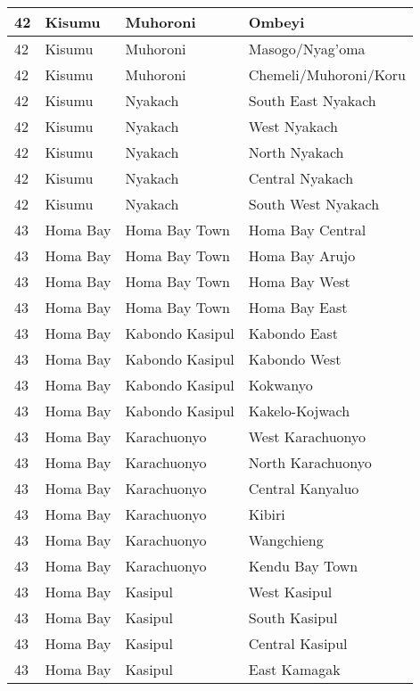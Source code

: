 \begin{table}[!ht]
\begin{tabular}{|l|l|l|l|}
        42 & Kisumu & Muhoroni & Ombeyi \\ \hline
        42 & Kisumu & Muhoroni & Masogo/Nyag’oma \\ \hline
        42 & Kisumu & Muhoroni & Chemeli/Muhoroni/Koru \\ \hline
        42 & Kisumu & Nyakach & South East Nyakach \\ \hline
        42 & Kisumu & Nyakach & West Nyakach \\ \hline
        42 & Kisumu & Nyakach & North Nyakach \\ \hline
        42 & Kisumu & Nyakach & Central Nyakach \\ \hline
        42 & Kisumu & Nyakach & South West Nyakach \\ \hline
        43 & Homa Bay & Homa Bay Town & Homa Bay Central \\ \hline
        43 & Homa Bay & Homa Bay Town & Homa Bay Arujo \\ \hline
        43 & Homa Bay & Homa Bay Town & Homa Bay West \\ \hline
        43 & Homa Bay & Homa Bay Town & Homa Bay East \\ \hline
        43 & Homa Bay & Kabondo Kasipul & Kabondo East \\ \hline
        43 & Homa Bay & Kabondo Kasipul & Kabondo West \\ \hline
        43 & Homa Bay & Kabondo Kasipul & Kokwanyo \\ \hline
        43 & Homa Bay & Kabondo Kasipul & Kakelo-Kojwach \\ \hline
        43 & Homa Bay & Karachuonyo & West Karachuonyo \\ \hline
        43 & Homa Bay & Karachuonyo & North Karachuonyo \\ \hline
        43 & Homa Bay & Karachuonyo & Central Kanyaluo \\ \hline
        43 & Homa Bay & Karachuonyo & Kibiri \\ \hline
        43 & Homa Bay & Karachuonyo & Wangchieng \\ \hline
        43 & Homa Bay & Karachuonyo & Kendu Bay Town \\ \hline
        43 & Homa Bay & Kasipul & West Kasipul \\ \hline
        43 & Homa Bay & Kasipul & South Kasipul \\ \hline
        43 & Homa Bay & Kasipul & Central Kasipul \\ \hline
        43 & Homa Bay & Kasipul & East Kamagak \\ \hline

\end{tabular}
\end{table}
